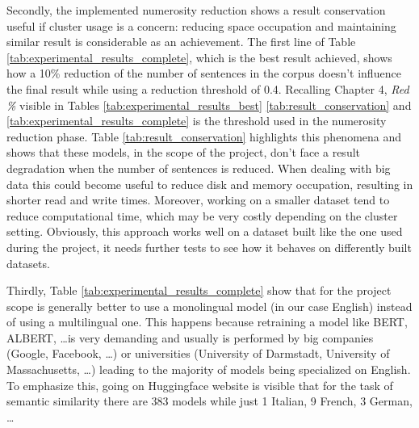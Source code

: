\documentclass[\main/main.tex]{subfiles}
\begin{document}
Secondly, the implemented numerosity reduction shows a result conservation useful if cluster usage is a concern: reducing space occupation and maintaining similar result is considerable as an achievement. The first line of Table \ref{tab:experimental_results_complete}, which is the best result achieved, shows how a 10\% reduction of the number of sentences in the corpus doesn't influence the final result while using a reduction threshold of 0.4. Recalling Chapter 4, \emph{Red \%} visible in Tables \ref{tab:experimental_results_best} \ref{tab:result_conservation} and \ref{tab:experimental_results_complete} is the threshold used in the numerosity reduction phase. Table \ref{tab:result_conservation} highlights this phenomena and shows that these models, in the scope of the project, don't face a result degradation when the number of sentences is reduced. When dealing with big data this could become useful to reduce disk and memory occupation, resulting in shorter read and write times. Moreover, working on a smaller dataset tend to reduce computational time, which may be very costly depending on the cluster setting. Obviously, this approach works well on a dataset built like the one used during the project, it needs further tests to see how it behaves on differently built datasets. 
\begin{table}[H]
\centering
{}
\caption{Result conservation}
\label{tab:result_conservation}
\end{table}
Thirdly, Table \ref{tab:experimental_results_complete} show that for the project scope is generally better to use a monolingual model (in our case English) instead of using a multilingual one. This happens because retraining a model like BERT, ALBERT, \dots is very demanding and usually is performed by big companies (Google, Facebook, \dots) or universities (University of Darmstadt, University of Massachusetts, \dots) leading to the majority of models being specialized on English. To emphasize this, going on Huggingface website \cite{huggingface_models} is visible that for the task of semantic similarity there are 383 models while just 1 Italian, 9 French, 3 German, \dots \\
\end{document}
